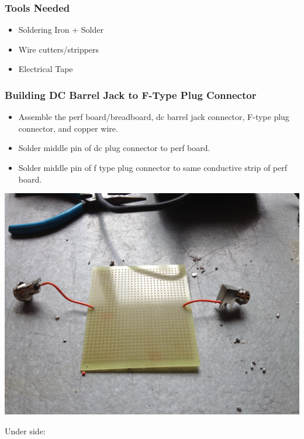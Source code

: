\documentclass[11pt]{article} %
\begin{document}
\subsubsection{Tools Needed}
\begin{multicols}{2}
\begin{itemize}
\item Soldering Iron + Solder
\item Wire cutters/strippers
\item Electrical Tape
\end{itemize}
\end{multicols}

\subsubsection{Building DC Barrel Jack to F-Type Plug Connector}

\begin{itemize}
\item Assemble the perf board/breadboard, dc barrel jack connector, F-type plug connector, and copper wire.
\item Solder middle pin of dc plug connector to perf board.
\item Solder middle pin of f type plug connector to same conductive strip of perf board. 
\end{itemize}

\begin{center}
\includegraphics[scale=0.20]{lnainterface/02.jpeg}
\end{center}

Under side:
\end{document}
